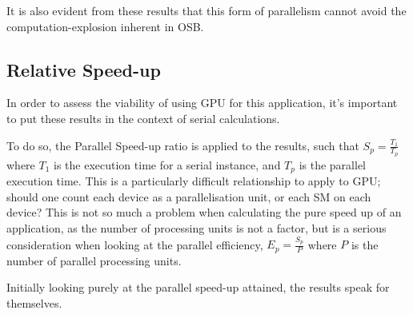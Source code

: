 It is also evident from these results that this form of parallelism cannot avoid the computation-explosion inherent in OSB. 
\subsection{Relative Speed-up}
In order to assess the viability of using GPU for this application, it's important to put these results in the context of serial calculations.

To do so, the Parallel Speed-up ratio is applied to the results, such that \(S_p=\frac{T_1}{T_p}\) where \(T_1\) is the execution time for a serial instance, and \(T_p\) is the parallel execution time. This is a particularly difficult relationship to apply to GPU; should one count each device as a parallelisation unit, or each SM on each device? This is not so much a problem when calculating the pure speed up of an application, as the number of processing units is not a factor, but is a serious consideration when looking at the parallel efficiency, \(E_p=\frac{S_p}{P}\) where \(P\) is the number of parallel processing units. 

Initially looking purely at the parallel speed-up attained, the results speak for themselves.
\begin{figure}[h!]
\centering
{}
\end{figure}

